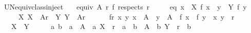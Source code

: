 \begin{isabellebody}
\begin{isamarkuptext}
\end{isamarkuptext}\isamarkuptrue%
\isamarkupfalse%
\ UN{\isacharunderscore}{\kern0pt}equiv{\isacharunderscore}{\kern0pt}class{\isacharunderscore}{\kern0pt}inject{\isacharcolon}{\kern0pt}\isanewline
\ \ \ {\isachardoublequoteopen}equiv\ A\ r{\isachardoublequoteclose}\ {\isachardoublequoteopen}f\ respects\ r{\isachardoublequoteclose}\isanewline
\ \ \ \ \ eq{\isacharcolon}{\kern0pt}\ {\isachardoublequoteopen}{\isacharparenleft}{\kern0pt}{\isasymUnion}x\ {\isasymin}\ X{\isachardot}{\kern0pt}\ f\ x{\isacharparenright}{\kern0pt}\ {\isacharequal}{\kern0pt}\ {\isacharparenleft}{\kern0pt}{\isasymUnion}y\ {\isasymin}\ Y{\isachardot}{\kern0pt}\ f\ y{\isacharparenright}{\kern0pt}{\isachardoublequoteclose}\ \isanewline
\ \ \ \ \ X{\isacharcolon}{\kern0pt}\ {\isachardoublequoteopen}X\ {\isasymin}\ A{\isacharslash}{\kern0pt}{\isacharslash}{\kern0pt}r{\isachardoublequoteclose}\ \ Y{\isacharcolon}{\kern0pt}\ {\isachardoublequoteopen}Y\ {\isasymin}\ A{\isacharslash}{\kern0pt}{\isacharslash}{\kern0pt}r{\isachardoublequoteclose}\ \isanewline
\ \ \ \ \ fr{\isacharcolon}{\kern0pt}\ {\isachardoublequoteopen}{\isasymAnd}x\ y{\isachardot}{\kern0pt}\ x\ {\isasymin}\ A\ {\isasymLongrightarrow}\ y\ {\isasymin}\ A\ {\isasymLongrightarrow}\ f\ x\ {\isacharequal}{\kern0pt}\ f\ y\ {\isasymLongrightarrow}\ {\isacharparenleft}{\kern0pt}x{\isacharcomma}{\kern0pt}\ y{\isacharparenright}{\kern0pt}\ {\isasymin}\ r{\isachardoublequoteclose}\isanewline
\ \ \ {\isachardoublequoteopen}X\ {\isacharequal}{\kern0pt}\ Y{\isachardoublequoteclose}\isanewline
%
\isadelimproof
%
\endisadelimproof
%
\isatagproof
{}\isamarkupfalse%
\ {\isacharminus}{\kern0pt}\isanewline
\ \ \isamarkupfalse%
\ a\ b\ \ {\isachardoublequoteopen}a\ {\isasymin}\ A{\isachardoublequoteclose}\ \ a{\isacharcolon}{\kern0pt}\ {\isachardoublequoteopen}X\ {\isacharequal}{\kern0pt}\ r\ {\isacharbackquote}{\kern0pt}{\isacharbackquote}{\kern0pt}\ {\isacharbraceleft}{\kern0pt}a{\isacharbraceright}{\kern0pt}{\isachardoublequoteclose}\ \ {\isachardoublequoteopen}b\ {\isasymin}\ A{\isachardoublequoteclose}\ \ b{\isacharcolon}{\kern0pt}\ {\isachardoublequoteopen}Y\ {\isacharequal}{\kern0pt}\ r\ {\isacharbackquote}{\kern0pt}{\isacharbackquote}{\kern0pt}\ {\isacharbraceleft}{\kern0pt}b{\isacharbraceright}{\kern0pt}{\isachardoublequoteclose}\isanewline
\ \ \ \ \isamarkupfalse%

\end{isabellebody}
